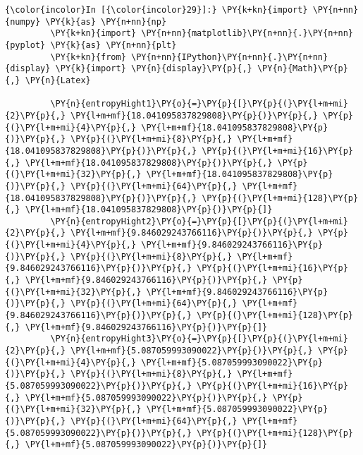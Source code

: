 {\begin{enumerate}
    \begin{Verbatim}[commandchars=\\\{\}]
{\color{incolor}In [{\color{incolor}29}]:} \PY{k+kn}{import} \PY{n+nn}{numpy} \PY{k}{as} \PY{n+nn}{np}
         \PY{k+kn}{import} \PY{n+nn}{matplotlib}\PY{n+nn}{.}\PY{n+nn}{pyplot} \PY{k}{as} \PY{n+nn}{plt}
         \PY{k+kn}{from} \PY{n+nn}{IPython}\PY{n+nn}{.}\PY{n+nn}{display} \PY{k}{import} \PY{n}{display}\PY{p}{,} \PY{n}{Math}\PY{p}{,} \PY{n}{Latex}
         
         \PY{n}{entropyHight1}\PY{o}{=}\PY{p}{[}\PY{p}{(}\PY{l+m+mi}{2}\PY{p}{,} \PY{l+m+mf}{18.041095837829808}\PY{p}{)}\PY{p}{,} \PY{p}{(}\PY{l+m+mi}{4}\PY{p}{,} \PY{l+m+mf}{18.041095837829808}\PY{p}{)}\PY{p}{,} \PY{p}{(}\PY{l+m+mi}{8}\PY{p}{,} \PY{l+m+mf}{18.041095837829808}\PY{p}{)}\PY{p}{,} \PY{p}{(}\PY{l+m+mi}{16}\PY{p}{,} \PY{l+m+mf}{18.041095837829808}\PY{p}{)}\PY{p}{,} \PY{p}{(}\PY{l+m+mi}{32}\PY{p}{,} \PY{l+m+mf}{18.041095837829808}\PY{p}{)}\PY{p}{,} \PY{p}{(}\PY{l+m+mi}{64}\PY{p}{,} \PY{l+m+mf}{18.041095837829808}\PY{p}{)}\PY{p}{,} \PY{p}{(}\PY{l+m+mi}{128}\PY{p}{,} \PY{l+m+mf}{18.041095837829808}\PY{p}{)}\PY{p}{]}
         \PY{n}{entropyHight2}\PY{o}{=}\PY{p}{[}\PY{p}{(}\PY{l+m+mi}{2}\PY{p}{,} \PY{l+m+mf}{9.846029243766116}\PY{p}{)}\PY{p}{,} \PY{p}{(}\PY{l+m+mi}{4}\PY{p}{,} \PY{l+m+mf}{9.846029243766116}\PY{p}{)}\PY{p}{,} \PY{p}{(}\PY{l+m+mi}{8}\PY{p}{,} \PY{l+m+mf}{9.846029243766116}\PY{p}{)}\PY{p}{,} \PY{p}{(}\PY{l+m+mi}{16}\PY{p}{,} \PY{l+m+mf}{9.846029243766116}\PY{p}{)}\PY{p}{,} \PY{p}{(}\PY{l+m+mi}{32}\PY{p}{,} \PY{l+m+mf}{9.846029243766116}\PY{p}{)}\PY{p}{,} \PY{p}{(}\PY{l+m+mi}{64}\PY{p}{,} \PY{l+m+mf}{9.846029243766116}\PY{p}{)}\PY{p}{,} \PY{p}{(}\PY{l+m+mi}{128}\PY{p}{,} \PY{l+m+mf}{9.846029243766116}\PY{p}{)}\PY{p}{]}
         \PY{n}{entropyHight3}\PY{o}{=}\PY{p}{[}\PY{p}{(}\PY{l+m+mi}{2}\PY{p}{,} \PY{l+m+mf}{5.087059993090022}\PY{p}{)}\PY{p}{,} \PY{p}{(}\PY{l+m+mi}{4}\PY{p}{,} \PY{l+m+mf}{5.087059993090022}\PY{p}{)}\PY{p}{,} \PY{p}{(}\PY{l+m+mi}{8}\PY{p}{,} \PY{l+m+mf}{5.087059993090022}\PY{p}{)}\PY{p}{,} \PY{p}{(}\PY{l+m+mi}{16}\PY{p}{,} \PY{l+m+mf}{5.087059993090022}\PY{p}{)}\PY{p}{,} \PY{p}{(}\PY{l+m+mi}{32}\PY{p}{,} \PY{l+m+mf}{5.087059993090022}\PY{p}{)}\PY{p}{,} \PY{p}{(}\PY{l+m+mi}{64}\PY{p}{,} \PY{l+m+mf}{5.087059993090022}\PY{p}{)}\PY{p}{,} \PY{p}{(}\PY{l+m+mi}{128}\PY{p}{,} \PY{l+m+mf}{5.087059993090022}\PY{p}{)}\PY{p}{]}
         

\end{Verbatim}
\end{enumerate}}
